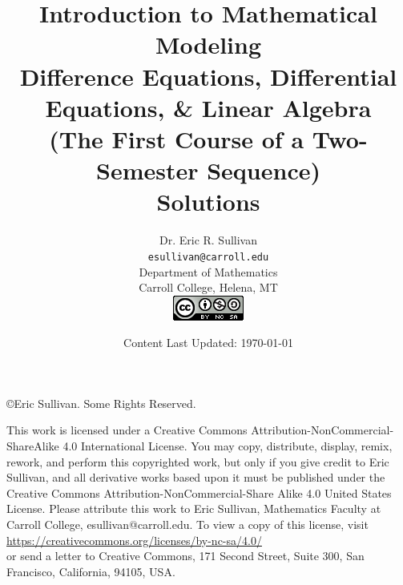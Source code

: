 \documentclass[12pt,oneside]{book}
\title{Introduction to Mathematical Modeling \\ \large Difference Equations, Differential
    Equations, \& Linear
    Algebra \\ {\small (The First Course of a Two-Semester Sequence)}
    \ifnum\ShowSoln=1 {\color{red} \\ {\bf Solutions}} \fi}
\date{Content Last Updated: \today}
\author{Dr. Eric R. Sullivan \\ \texttt{esullivan@carroll.edu}\\ Department of
Mathematics \\
Carroll College, Helena, MT \\
\includegraphics{CreativeCommons.png} \\\vspace{3in}
}
\theoremstyle{definition}
\begin{document}
\maketitle
\newpage
\noindent \copyright Eric Sullivan. Some Rights Reserved.

\vspace{0.2in}
This work is licensed under a Creative Commons Attribution-NonCommercial-ShareAlike 4.0
International License.
You may copy, distribute, display, remix, rework, and perform this copyrighted work, but only if
you give credit to Eric Sullivan, and all derivative works based upon it must be published
under the Creative Commons Attribution-NonCommercial-Share Alike 4.0 United States License. Please
attribute this work to Eric Sullivan, Mathematics Faculty at Carroll College,
esullivan@carroll.edu. To view a copy of this license, visit\\
\href{https://creativecommons.org/licenses/by-nc-sa/4.0/}{https://creativecommons.org/licenses/by-nc-sa/4.0/}\\
or send a letter to Creative Commons, 171 Second Street, Suite 300, San Francisco,
California, 94105, USA.
\tableofcontents









% 
% 
% 
% 
% 
% 
% 
% 
% 
% 
% 
\begin{appendices}
    
\end{appendices}
\end{document}
